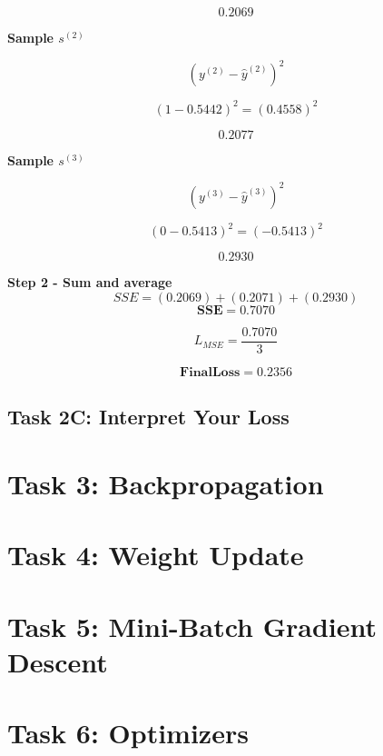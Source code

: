 \documentclass[runningheads]{llncs}
\begin{document}
\[
\mathbf{0.2069}
\]


\textbf{Sample $s^{(2)}$}

\[
(y^{(2)} - \hat{y}^{(2)})^2
\]

\[
(1 - 0.5442)^2 = (0.4558)^2
\]

\[
\mathbf{0.2077}
\]


\textbf{Sample $s^{(3)}$}

\[
(y^{(3)} - \hat{y}^{(3)})^2
\]

\[
(0 - 0.5413)^2 = (-0.5413)^2
\]

\[
\mathbf{0.2930}
\]

\textbf{Step 2 - Sum and average\\ }
\[
SSE = (0.2069)+(0.2071)+(0.2930)
\]
\[
\mathbf{SSE = 0.7070}
\]

\[
L_{MSE} = \frac{0.7070}{3}
\]

\[
\mathbf{Final Loss = 0.2356}
\]

\subsection{Task 2C: Interpret Your Loss}


\section{Task 3: Backpropagation}


\section{Task 4: Weight Update}


\section{Task 5: Mini-Batch Gradient Descent}


\section{Task 6: Optimizers}
\end{document}

